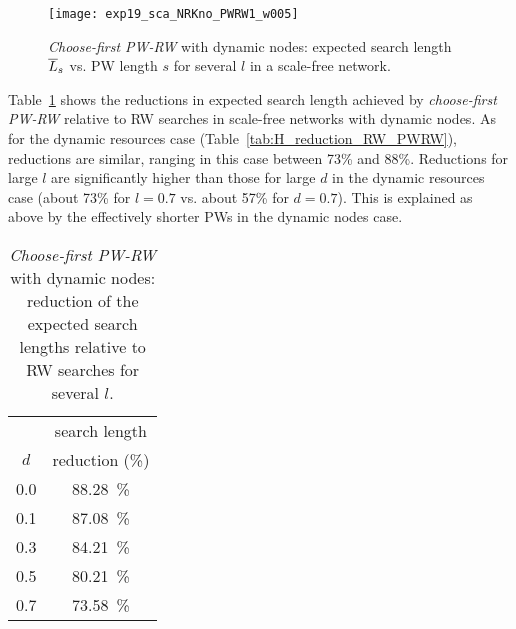 \documentclass[]{elsarticle}
\newcommand{\s}		{\ensuremath{s}}		\newcommand{\sopt}	{\ensuremath{s_{opt}}}		\newcommand{\p}		{\ensuremath{p}}		\newcommand{\W}		{\ensuremath{W}}		\newcommand{\w}		{\ensuremath{w}}		\newcommand{\lsave}	{\ensuremath{\overline{l}_s}}	\newcommand{\lave}	{\ensuremath{\overline{l}}}	\newcommand{\lopt}	{\ensuremath{\overline{l}_{opt}}}
\begin{document}
\begin{figure}
 \centering
 \texttt{[image: exp19\_sca\_NRKno\_PWRW1\_w005]}
 \caption{\emph{Choose-first PW-RW} with dynamic nodes: expected search length $\overline{L}_s$ vs. PW length $\s$ for several $l$ in a scale-free network.}
 \label{fig:scalefree_pw1_dynnodes}
\end{figure}

Table~\ref{tab:H_reduction_RW_PWRW_dynnodes} shows the reductions in expected search length achieved by \emph{choose-first PW-RW} relative to RW searches in scale-free networks with dynamic nodes. As for the dynamic resources case (Table~\ref{tab:H_reduction_RW_PWRW}), reductions are similar, ranging in this case between 73\% and 88\%. Reductions for large $l$ are significantly higher than those for large $d$ in the dynamic resources case (about 73\% for $l=0.7$ vs. about 57\% for $d=0.7$). This is explained as above by the effectively shorter PWs in the dynamic nodes case.
\begin{table}
\centering
\begin{tabular}{|c|c|}
\hline
\rule{0pt}{11pt}   & search length \\ 
              $d$  & reduction (\%)\\ \hline
              0.0  &  88.28~\% \\
              0.1  &  87.08~\% \\
              0.3  &  84.21~\% \\
              0.5  &  80.21~\% \\
              0.7  &  73.58~\% \\
\hline
\end{tabular}
\caption{\emph{Choose-first PW-RW} with dynamic nodes: reduction of the expected search lengths relative to RW searches for several $l$.}
\label{tab:H_reduction_RW_PWRW_dynnodes}
\end{table}
\end{document}
